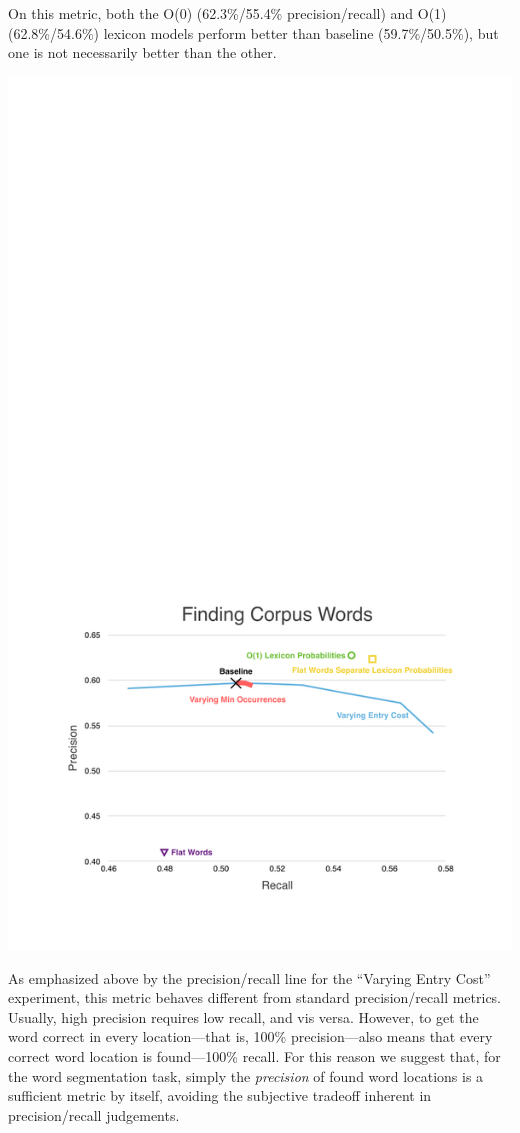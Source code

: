 \documentclass[11pt, oneside, fleqn]{article}
\begin{document}
	On this metric, both the O(0) (62.3\%/55.4\% precision/recall) and O(1) (62.8\%/54.6\%) lexicon models perform better than baseline (59.7\%/50.5\%), but one is not necessarily better than the other.

  \includegraphics[scale=0.9]{./figure/finding_corpus_word.pdf}

	As emphasized above by the precision/recall line for the ``Varying Entry Cost'' experiment, this metric behaves different from standard precision/recall metrics. Usually, high precision requires low recall, and vis versa. However, to get the word correct in every location---that is, 100\% precision---also means that every correct word location is found---100\% recall. For this reason we suggest that, for the word segmentation task, simply the \textit{precision} of found word locations is a sufficient metric by itself, avoiding the subjective tradeoff inherent in precision/recall judgements.
	
\end{document}
